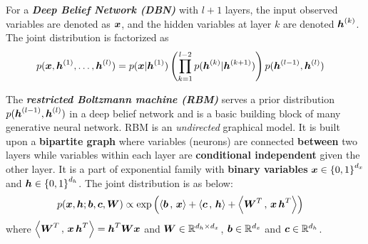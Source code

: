 \documentclass[11pt]{article}
\begin{document}
For a \textbf{\emph{Deep Belief Network (DBN)}} with $l+1$ layers, the input observed variables are  denoted as $\boldsymbol{x}$, and the hidden variables at layer $k$ are denoted $\boldsymbol{h}^{(k)}$. The joint distribution is factorized as 
\begin{align}
p(\boldsymbol{x}, \boldsymbol{h}^{(1)}, \ldots, \boldsymbol{h}^{(l)}) &= p(\boldsymbol{x}|\boldsymbol{h}^{(1)})\left(\prod_{k=1}^{l-2}p(\boldsymbol{h}^{(k)} | \boldsymbol{h}^{(k+1)})\right)p(\boldsymbol{h}^{(l-1)}, \boldsymbol{h}^{(l)}) \label{eqn: deep_net_bayes}
\end{align}

The \textbf{\emph{restricted Boltzmann machine (RBM)}} serves a prior distribution $p(\boldsymbol{h}^{(l-1)}, \boldsymbol{h}^{(l)})$ in a deep belief network and is a basic building block of many generative neural network. RBM is an \emph{undirected} graphical model.   It is built upon a \textbf{bipartite graph} where variables (neurons) are connected \textbf{between} two layers while variables within each layer are \textbf{conditional independent} given the other layer.  It is a  part of exponential family with \textbf{binary variables} $\boldsymbol{x} \in \left\{0,1\right\}^{d_x}$ and $\boldsymbol{h} \in \left\{0,1\right\}^{d_h}$. The joint distribution is as below: 
\begin{align}
p(\boldsymbol{x}, \boldsymbol{h};  \boldsymbol{b},  \boldsymbol{c},\boldsymbol{W}) &\propto \exp\left(\left\langle \boldsymbol{b}\,,\, \boldsymbol{x} \right\rangle + \left\langle \boldsymbol{c}\,,\, \boldsymbol{h} \right\rangle + \left\langle \boldsymbol{W}^{T}\,,\, \boldsymbol{x}\,\boldsymbol{h}^{T} \right\rangle\right) \label{eqn: rbm}
\end{align} where  $\left\langle \boldsymbol{W}^{T}\,,\, \boldsymbol{x}\,\boldsymbol{h}^{T} \right\rangle = \boldsymbol{h}^{T}\boldsymbol{W}\boldsymbol{x}$ and $\boldsymbol{W} \in {\mathbb R}^{d_{h} \times d_{x}}$, $\boldsymbol{b}\in {\mathbb R}^{d_{x}}$ and $\boldsymbol{c} \in {\mathbb R}^{d_{h}}$.
\end{document}
